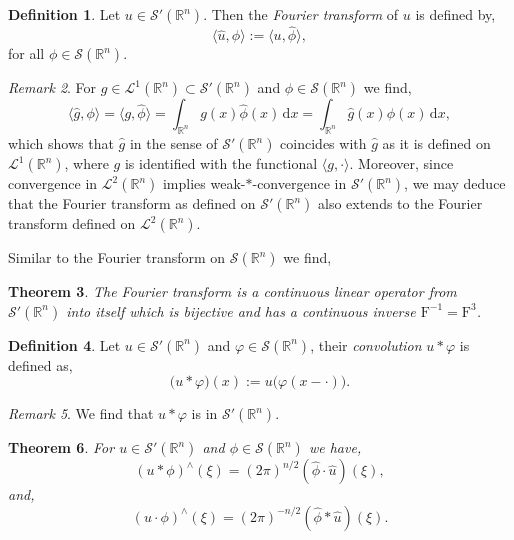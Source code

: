 \documentclass[a4paper, 12pt]{report}
\newtheorem{theorem}{Theorem}[section]
\theoremstyle{cor}
\theoremstyle{remark}
\newtheorem{remark}[theorem]{Remark}
\theoremstyle{definition}
\newtheorem{defn}[theorem]{Definition}
\begin{document}
\begin{defn}
Let $u \in \mathcal{S}'(\mathbb{R}^n)$.  Then the \emph{Fourier transform} of $u$ is defined by,
\begin{equation}
\langle\hat{u}, \phi\rangle := \langle u, \hat{\phi}\rangle,
\end{equation}
for all $\phi \in \mathcal{S}(\mathbb{R}^n)$.
\end{defn}
\begin{remark}
For $g \in \mathcal{L}^1(\mathbb{R}^n) \subset \mathcal{S}'(\mathbb{R}^n)$ and $\phi \in \mathcal{S}(\mathbb{R}^n)$ we find,
$$
\langle\hat{g}, \phi\rangle = \langle g, \hat{\phi}\rangle = \int_{\mathbb{R}^n}g(x)\hat{\phi}(x)\,\mathrm{d}x = \int_{\mathbb{R}^n}\hat{g}(x)\phi(x)\,\mathrm{d}x,
$$
which shows that $\hat{g}$ in the sense of $\mathcal{S}'(\mathbb{R}^n)$ coincides with $\hat{g}$ as it is defined on $\mathcal{L}^1(\mathbb{R}^n)$, where $g$ is identified with the functional $\langle g, \cdot \rangle$.  Moreover, since convergence in $\mathcal{L}^2(\mathbb{R}^n)$ implies weak-$\ast$-convergence in $\mathcal{S}'(\mathbb{R}^n)$, we may deduce that the Fourier transform as defined on $\mathcal{S}'(\mathbb{R}^n)$ also extends to the Fourier transform defined on $\mathcal{L}^2(\mathbb{R}^n)$.
\end{remark}

Similar to the Fourier transform on $\mathcal{S}(\mathbb{R}^n)$ we find,
\begin{theorem}
The Fourier transform is a continuous linear operator from $\mathcal{S}'(\mathbb{R}^n)$ into itself which is bijective and has a continuous inverse $\mathrm{F}^{-1} = \mathrm{F}^3$.
\end{theorem}

\begin{defn}
Let $u \in \mathcal{S}'(\mathbb{R}^n)$ and $\varphi \in \mathcal{S}(\mathbb{R}^n)$, their \emph{convolution} $u \ast \varphi$ is defined as,
\begin{equation}
\big(u \ast \varphi\big)(x) := u\big(\varphi(x - \cdot)\big).
\end{equation}
\end{defn}
\begin{remark}
We find that $u \ast \varphi$ is in $\mathcal{S}'(\mathbb{R}^n)$.
\end{remark}

\begin{theorem}
For $u \in \mathcal{S}'(\mathbb{R}^n)$ and $\phi \in \mathcal{S}(\mathbb{R}^n)$ we have,
\begin{equation}
(u\ast\phi)^\wedge(\xi) = (2\pi)^{n/2}(\hat{\phi}\cdot\hat{u})(\xi),
\end{equation}
and,
\begin{equation}
(u\cdot\phi)^\wedge(\xi) = (2\pi)^{-n/2}(\hat{\phi}\ast\hat{u})(\xi).
\end{equation}
\end{theorem}
\end{document}
